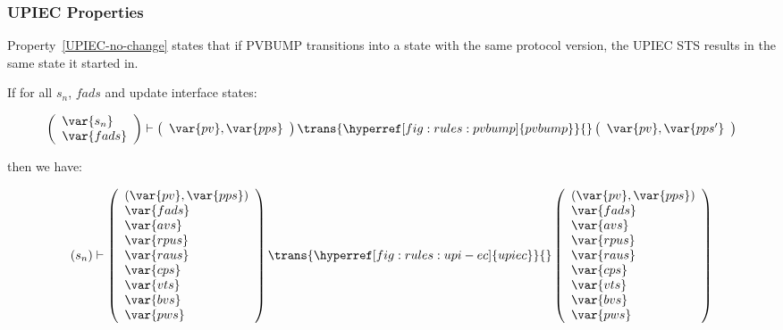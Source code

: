 \subsubsection{UPIEC Properties}
\label{sec:upiec-properties}

Property~\ref{UPIEC-no-change} states that if PVBUMP transitions into a state
with the same protocol version, the UPIEC STS results in the same state it
started in.

\begin{property}\label{UPIEC-no-change}
  \textnormal{If for all $s_n$, $fads$ and update interface states:}

  $$
  \left(
    \begin{array}{l}
      \var{s_n}\\
      \var{fads}
    \end{array}
  \right)
  \vdash
  \left(
    \begin{array}{l}
      \var{pv}, \var{pps}\\
    \end{array}
  \right)
  \trans{\hyperref[fig:rules:pvbump]{pvbump}}{}
  \left(
    \begin{array}{l}
      \var{pv}, \var{pps'}\\
    \end{array}
  \right)
  $$

  \textnormal{then we have:}

  $$
  (s_n)
  \vdash
  \left(
    \begin{array}{l}
      (\var{pv}, \var{pps})\\
      \var{fads}\\
      \var{avs}\\
      \var{rpus}\\
      \var{raus}\\
      \var{cps}\\
      \var{vts}\\
      \var{bvs}\\
      \var{pws}
    \end{array}
  \right)
  \trans{\hyperref[fig:rules:upi-ec]{upiec}}{}
  \left(
    \begin{array}{l}
      (\var{pv}, \var{pps})\\
      \var{fads}\\
      \var{avs}\\
      \var{rpus}\\
      \var{raus}\\
      \var{cps}\\
      \var{vts}\\
      \var{bvs}\\
      \var{pws}
    \end{array}
  \right)
  $$

\end{property}



